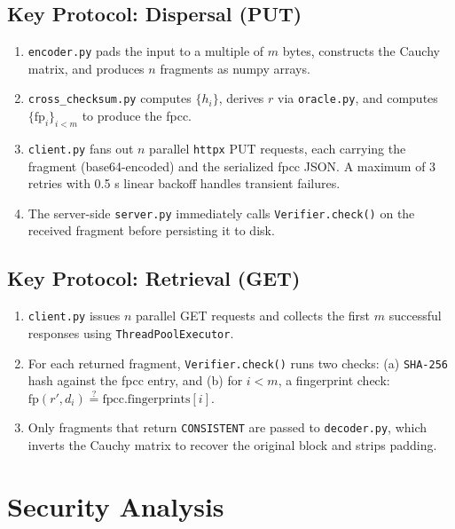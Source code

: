 \documentclass[10pt]{article}
\begin{document}
\subsection{Key Protocol: Dispersal (PUT)}

\begin{enumerate}
  \item \texttt{encoder.py} pads the input to a multiple of $m$ bytes, constructs the
        Cauchy matrix, and produces $n$ fragments as numpy arrays.
  \item \texttt{cross\_checksum.py} computes $\{h_i\}$, derives $r$ via
        \texttt{oracle.py}, and computes $\{\mathrm{fp}_i\}_{i<m}$ to produce the fpcc.
  \item \texttt{client.py} fans out $n$ parallel \texttt{httpx} PUT requests, each
        carrying the fragment (base64-encoded) and the serialized fpcc JSON.  A maximum
        of 3 retries with 0.5 s linear backoff handles transient failures.
  \item The server-side \texttt{server.py} immediately calls \texttt{Verifier.check()}
        on the received fragment before persisting it to disk.
\end{enumerate}

\subsection{Key Protocol: Retrieval (GET)}

\begin{enumerate}
  \item \texttt{client.py} issues $n$ parallel GET requests and collects the first $m$
        successful responses using \texttt{ThreadPoolExecutor}.
  \item For each returned fragment, \texttt{Verifier.check()} runs two checks:
        (a) \texttt{SHA-256} hash against the fpcc entry, and
        (b) for $i < m$, a fingerprint check: $\mathrm{fp}(r', d_i) \stackrel{?}{=}
            \mathrm{fpcc.fingerprints}[i]$.
  \item Only fragments that return \texttt{CONSISTENT} are passed to
        \texttt{decoder.py}, which inverts the Cauchy matrix to recover the original
        block and strips padding.
\end{enumerate}

\section{Security Analysis}
\end{document}
